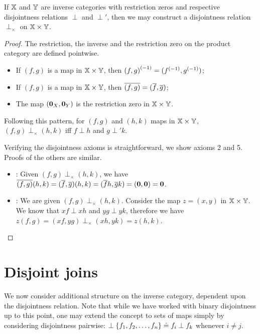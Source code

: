 \begin{lemma}\label{lem:disjointness_is_derivable_on_a_product_category}
  If $\mathbb{X}$ and $\mathbb{Y}$ are inverse categories with restriction zeros and respective disjointness
  relations $\perp$ and $\perp'$, then we may construct a disjointness relation
  $\perp_{\times}$ on $\mathbb{X}\times\mathbb{Y}$.
\end{lemma}
\begin{proof}
  The restriction, the inverse and the restriction zero on the product category are defined pointwise.
  \begin{itemize}
    \item If $(f,g)$ is a map in $\mathbb{X}\times\mathbb{Y}$, then ${(f,g)}^{(-1)} = ({f}^{(-1)}, {g}^{(-1)})$;
    \item If $(f,g)$ is a map in $\mathbb{X}\times\mathbb{Y}$, then $\overline{(f,g)} = (\overline{f}, \overline{g})$;
    \item The map $(\mathbf{0}_X,\mathbf{0}_Y)$ is the restriction zero in $\mathbb{X}\times\mathbb{Y}$.
  \end{itemize}

  Following this pattern, for $(f,g)$ and $(h,k)$ maps in $\mathbb{X}\times\mathbb{Y}$, $(f,g) \perp_{\times}(h,k)$
  iff $f\perp h$ and $g\perp' k$.

  Verifying the disjointness axioms is straightforward, we show axioms 2 and 5. Proofs of the
  others are similar.
  {
  \begin{itemize}
    \item [\axiom{Dis}{2}]: Given $(f,g)\perp_{\times}(h,k)$, we have
      $\overline{(f,g)}(h,k) =  (\overline{f},\overline{g})(h,k) = (\overline{f} h, \overline{g} k) = (\mathbf{0}, \mathbf{0}) = \mathbf{0}$.
    \item [\axiom{Dis}{5}]: We are given $(f,g)\perp_{\times}(h,k)$. Consider the map $z = (x,y)$
      in $\mathbb{X} \times \mathbb{Y}$. We know that $x f \perp x h$ and $y g \perp y k$, therefore we have
      $z(f,g) = (x f, y g) \perp_{\times} (x h, y k) = z(h,k)$.
  \end{itemize}
  }
\end{proof}

\section{Disjoint joins} %
\label{sec:disjoint_joins}

We now consider additional structure on the inverse category, dependent upon the disjointness
relation. Note that while we have worked with binary disjointness up to this point, one may extend
the concept to sets of maps simply by considering disjointness pairwise:
$\perp \{f_1,f_2,\ldots,f_n\} \doteq f_i \perp f_k$ whenever $i \ne j$.

